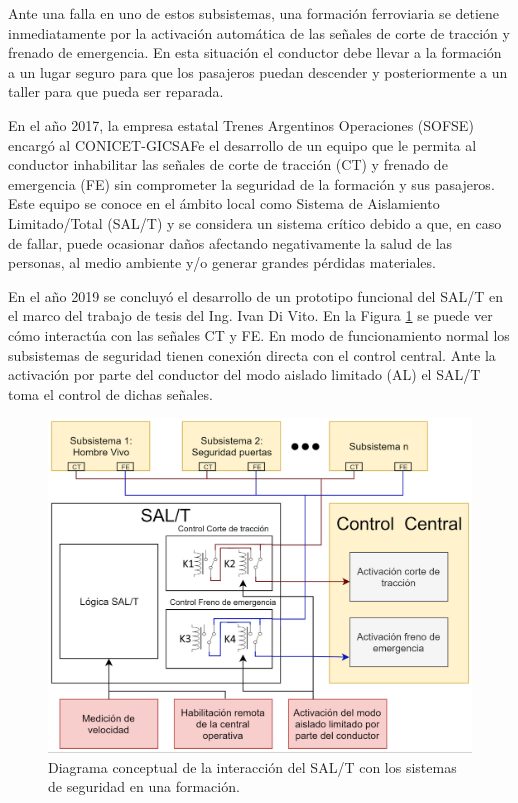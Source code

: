 \documentclass[11pt]{charter}
\begin{document}
Ante una falla en uno de estos subsistemas, una formación ferroviaria se detiene inmediatamente por la activación 
automática de las señales de corte de tracción y frenado de emergencia. En esta situación el conductor debe llevar a la 
formación a un lugar seguro para que los pasajeros puedan descender y posteriormente a un taller para que pueda ser 
reparada.

En el año 2017, la empresa estatal Trenes Argentinos Operaciones (SOFSE) encargó al CONICET-GICSAFe el desarrollo de un 
equipo que le permita al conductor inhabilitar las señales de corte de tracción (CT) y frenado de emergencia (FE) sin comprometer 
la seguridad de la formación y sus pasajeros. Este equipo se conoce en el ámbito local como Sistema de Aislamiento 
Limitado/Total (SAL/T) y se considera un sistema crítico debido a que, en caso de fallar, puede 
ocasionar daños afectando negativamente la salud de las personas, al medio ambiente y/o generar grandes pérdidas 
materiales.

En el año 2019 se concluyó el desarrollo de un prototipo funcional del SAL/T  en el marco del trabajo de tesis del Ing. 
Ivan Di Vito. En la Figura \ref{fig:diagrama_de_bloques} se puede ver cómo interactúa con las señales CT y FE. En modo 
de funcionamiento normal los subsistemas de seguridad tienen conexión directa con el control central. Ante la activación 
por parte del conductor del modo aislado limitado (AL) el SAL/T toma el control de dichas señales.

\begin{figure}[htpb]
\centering 
\includegraphics[width=.85\textwidth]{./Figuras/diagrama_de_bloques.png}
\caption{Diagrama conceptual de la interacción del SAL/T con los sistemas de seguridad en una formación.}
\label{fig:diagrama_de_bloques}
\end{figure}
\end{document}
